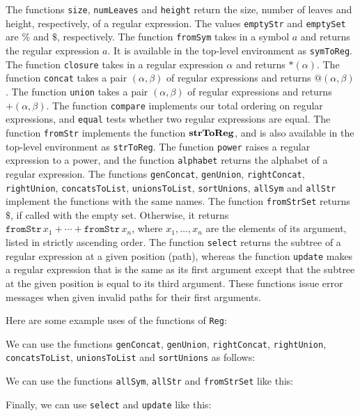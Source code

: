 The functions \texttt{size}, \texttt{numLeaves}
and \texttt{height} return the size, number of leaves and
height, respectively, of a regular expression.
The values \texttt{emptyStr} and \texttt{emptySet} are
$\%$ and $\$$, respectively.  The function \texttt{fromSym}
takes in a symbol $a$ and returns the regular expression $a$.
It is available in the
top-level environment as \texttt{symToReg}.
%
The function \texttt{closure} takes in a regular expression $\alpha$ and
returns ${*}(\alpha)$.  The function \texttt{concat} takes a pair $(\alpha,
\beta)$ of regular expressions and returns ${@}(\alpha,\beta)$.
The function \texttt{union} takes a pair $(\alpha,
\beta)$ of regular expressions and returns ${+}(\alpha,\beta)$.
The function \texttt{compare} implements our total ordering on
regular expressions, and \texttt{equal} tests whether two
regular expressions are equal.
The function \texttt{fromStr} implements the function $\mathbf{strToReg}$,
and is also available in the top-level environment as \texttt{strToReg}.
%
The function \texttt{power} raises a regular
expression to a power, and the
function \texttt{alphabet} returns the alphabet of a regular
expression.
The functions \texttt{genConcat}, \texttt{genUnion},
\texttt{rightConcat}, \texttt{rightUnion}, \texttt{concatsToList},
\texttt{unionsToList}, \texttt{sortUnions}, \texttt{allSym} and
\texttt{allStr} implement the functions with the same names.
The function \texttt{fromStrSet} returns $\$$, if called with
the empty set. Otherwise, it returns $\mathtt{fromStr}\,x_1 + \cdots +
\mathtt{fromStr}\,x_n$, where $x_1,\ldots,x_n$ are the elements
of its argument, listed in strictly ascending order.
The function \texttt{select} returns the subtree of a regular expression
at a given position (path), whereas the function \texttt{update}
makes a regular expression that is the same as its first argument except
that the subtree at the given position is equal to its third
argument. These functions issue error messages when given invalid
paths for their first arguments.

Here are some example uses of the functions of \texttt{Reg}:

We can use the functions \texttt{genConcat}, \texttt{genUnion},
\texttt{rightConcat}, \texttt{rightUnion}, \texttt{concatsToList},
\texttt{unionsToList} and \texttt{sortUnions} as follows:

We can use the functions \texttt{allSym}, \texttt{allStr} and
\texttt{fromStrSet} like this:

Finally, we can use \texttt{select} and \texttt{update} like this:


